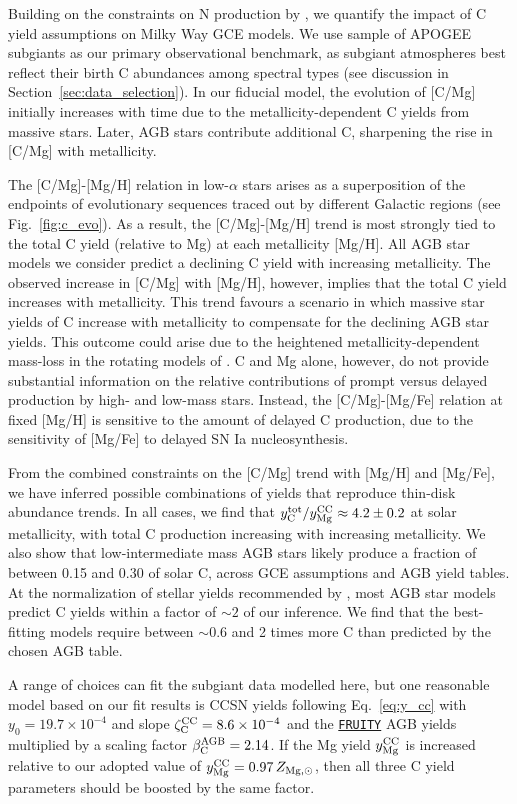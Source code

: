 \documentclass[fleqn,
usenatbib]{mnras}
\makeatletter
\newcommand{\fruity}{\texttt{\hyperlink{fruity}{FRUITY}}}
\newcommand{\caah}{[C/Mg]-[Mg/H]}
\newcommand{\caafe}{[C/Mg]-[Mg/Fe]}
\newcommand{\Yct}{{y_{\rm C}^{\rm  tot}}}
\newcommand{\Ymg}{{y_{\rm Mg}^{\rm CC}}}
\newcommand{\aagb}{\beta_{\rm C}^{\rm AGB}}
\newcommand{\yo}{y_0}
\newcommand{\zcc}{\zeta_{\rm C}^{\rm CC}}
\DeclareRobustCommand\citepos
  {\begingroup
   \let\NAT@nmfmt\NAT@posfmt%
   \NAT@swafalse\let\NAT@ctype\z@\NAT@partrue
   \@ifstar{\NAT@fulltrue\NAT@citetp}{\NAT@fullfalse\NAT@citetp}}
\let\NAT@orig@nmfmt\NAT@nmfmt
\def\NAT@posfmt#1{\NAT@orig@nmfmt{#1's}}
\makeatother
\begin{document}
Building on the constraints on N production by \citet{james+23}, we quantify the impact of C yield assumptions on Milky Way GCE models. We use \citepos{jack} sample of APOGEE subgiants as our primary observational benchmark, as subgiant atmospheres best reflect their birth C abundances among spectral types (see discussion in Section~\ref{sec:data_selection}).
In our fiducial model, the evolution of [C/Mg] initially increases with time due to the metallicity-dependent C yields from massive stars. Later, AGB stars contribute additional C, sharpening the rise in [C/Mg] with metallicity. 

The \caah{} relation in low-$\alpha$ stars arises as a superposition of the endpoints of evolutionary sequences traced out by different Galactic regions (see Fig.~\ref{fig:c_evo}). As a result, the \caah{} trend is most strongly tied to the total C yield (relative to Mg) at each metallicity [Mg/H]. All AGB star models we consider predict a declining C yield with increasing metallicity. The observed increase in [C/Mg] with [Mg/H], however, implies that the total C yield increases with metallicity. This trend favours a scenario in which massive star yields of C increase with metallicity to compensate for the declining AGB star yields. This outcome could arise due to the heightened metallicity-dependent mass-loss in the rotating models of \citet{LC18}. C and Mg alone, however, do not provide substantial information on the relative contributions of prompt versus delayed production by high- and low-mass stars.
Instead, the \caafe{} relation at fixed [Mg/H] is sensitive to the amount of delayed C production, due to the sensitivity of [Mg/Fe] to delayed SN Ia nucleosynthesis.


From the combined constraints on the [C/Mg] trend with [Mg/H] and [Mg/Fe], we have inferred possible combinations of yields that reproduce thin-disk abundance trends. In all cases, we find that $\Yct / \Ymg \approx 4.2 \pm 0.2$ at solar metallicity, with total C production increasing with increasing metallicity. We also show that low-intermediate mass AGB stars likely produce a fraction of between 0.15 and 0.30 of solar C, across GCE assumptions and AGB yield tables.
At the normalization of stellar yields recommended by \citep{david_fe},  most AGB star models predict C yields within a factor of ${\sim}2$ of our inference.  We find that the best-fitting models require between ${\sim}0.6$ and 2 times more C than predicted by the chosen AGB table.



A range of choices can fit the subgiant data modelled here, but one reasonable model based on our fit results is CCSN yields following Eq.~\ref{eq:y_cc} with $\yo=19.7\times10^{-4}$ and slope $\zcc=8.6\times10^{-4}$ and the \fruity{} AGB yields multiplied by a scaling factor $\aagb=2.14$. If the Mg yield $\Ymg$ is increased relative to our adopted value of $\Ymg=0.97\,Z_{\rm Mg, \odot}$, then all three C yield parameters should be boosted by the same factor.
\end{document}
